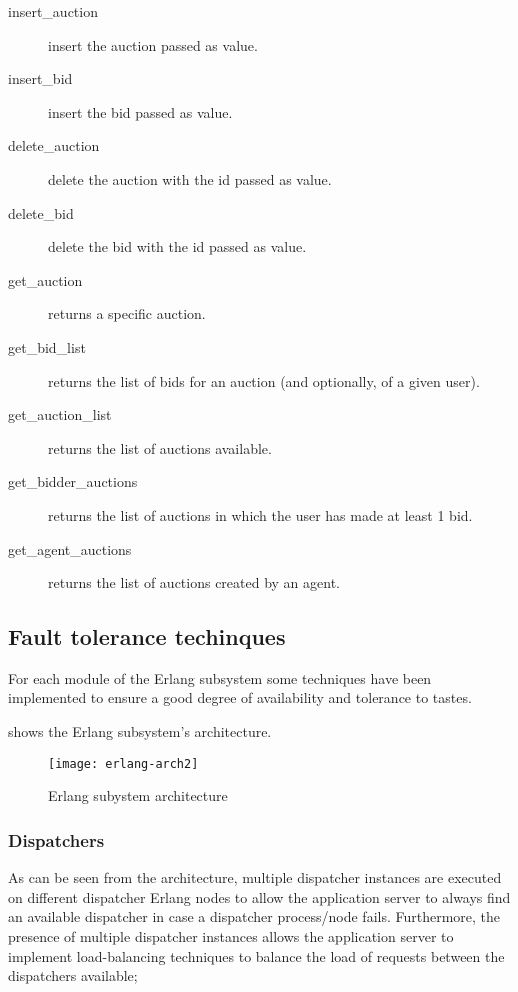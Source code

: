\begin{description}
	\item[insert\_auction] insert the auction passed as value.
	\item[insert\_bid] insert the bid passed as value.
	\item[delete\_auction] delete the auction with the id passed as value.
	\item[delete\_bid] delete the bid with the id passed as value.
	\item[get\_auction] returns a specific auction.
	\item[get\_bid\_list] returns the list of bids for an auction (and
		optionally, of a given user).
	\item[get\_auction\_list] returns the list of auctions available.
	\item[get\_bidder\_auctions] returns the list of auctions in which the
		user has made at least 1 bid.
	\item[get\_agent\_auctions] returns the list of auctions created by an
		agent.
\end{description}

\subsection{Fault tolerance techinques}\label{subsec:tolerancetechs}

For each module of the Erlang subsystem some techniques have been implemented to
ensure a good degree of availability and tolerance to tastes.

 shows the Erlang subsystem's architecture.

\begin{figure}[htb]
	\centering
	\texttt{[image: erlang-arch2]}
	\caption{Erlang subystem architecture}\label{fig:erlang-arch2}
\end{figure}

\subsubsection{Dispatchers}

As can be seen from the architecture, multiple dispatcher instances are executed
on different dispatcher Erlang nodes to allow the application server to always
find an available dispatcher in case a dispatcher process/node fails.
Furthermore, the presence of multiple dispatcher instances allows the
application server to implement load-balancing techniques to balance the load of
requests between the dispatchers available;

